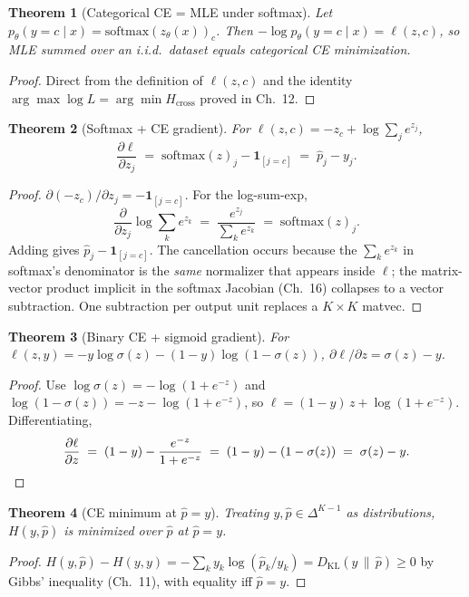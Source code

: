 \documentclass[11pt]{article}
\newtheorem{theorem}{Theorem}[section]
\theoremstyle{remark}
\begin{document}
\begin{theorem}[Categorical CE = MLE under softmax]
Let $p_\theta(y = c \mid x) = \mathrm{softmax}(z_\theta(x))_c$. Then
$-\log p_\theta(y = c \mid x) = \ell(z, c)$, so MLE summed over an i.i.d.\ dataset equals categorical CE
minimization.
\end{theorem}
\begin{proof}
Direct from the definition of $\ell(z, c)$ and the identity $\arg\max \log L = \arg\min H_{\mathrm{cross}}$
proved in Ch.~12.
\end{proof}

\begin{theorem}[Softmax + CE gradient]
For $\ell(z, c) = -z_c + \log \sum_j e^{z_j}$,
\[
\frac{\partial \ell}{\partial z_j} \;=\; \mathrm{softmax}(z)_j - \mathbf{1}_{[j=c]} \;=\; \hat p_j - y_j.
\]
\end{theorem}
\begin{proof}
$\partial(-z_c)/\partial z_j = -\mathbf{1}_{[j=c]}$. For the log-sum-exp,
\[
\frac{\partial}{\partial z_j} \log \sum_k e^{z_k}
\;=\; \frac{e^{z_j}}{\sum_k e^{z_k}}
\;=\; \mathrm{softmax}(z)_j.
\]
Adding gives $\hat p_j - \mathbf{1}_{[j=c]}$. The cancellation occurs because the $\sum_k e^{z_k}$ in
softmax's denominator is the \emph{same} normalizer that appears inside $\ell$; the matrix-vector product
implicit in the softmax Jacobian (Ch.~16) collapses to a vector subtraction. One subtraction per output
unit replaces a $K \times K$ matvec.
\end{proof}

\begin{theorem}[Binary CE + sigmoid gradient]
For $\ell(z, y) = -y\log \sigma(z) - (1-y)\log(1-\sigma(z))$, $\partial \ell/\partial z = \sigma(z) - y$.
\end{theorem}
\begin{proof}
Use $\log \sigma(z) = -\log(1+e^{-z})$ and $\log(1-\sigma(z)) = -z - \log(1+e^{-z})$, so
$\ell = (1-y)\,z + \log(1+e^{-z})$. Differentiating,
\[
\frac{\partial \ell}{\partial z} \;=\; (1-y) - \frac{e^{-z}}{1+e^{-z}} \;=\; (1-y) - (1-\sigma(z)) \;=\; \sigma(z) - y. \qedhere
\]
\end{proof}

\begin{theorem}[CE minimum at $\hat p = y$]
Treating $y, \hat p \in \Delta^{K-1}$ as distributions, $H(y, \hat p)$ is minimized over $\hat p$ at
$\hat p = y$.
\end{theorem}
\begin{proof}
$H(y, \hat p) - H(y, y) = -\sum_k y_k \log(\hat p_k / y_k) = D_{\mathrm{KL}}(y \,\|\, \hat p) \ge 0$ by
Gibbs' inequality (Ch.~11), with equality iff $\hat p = y$.
\end{proof}
\end{document}
